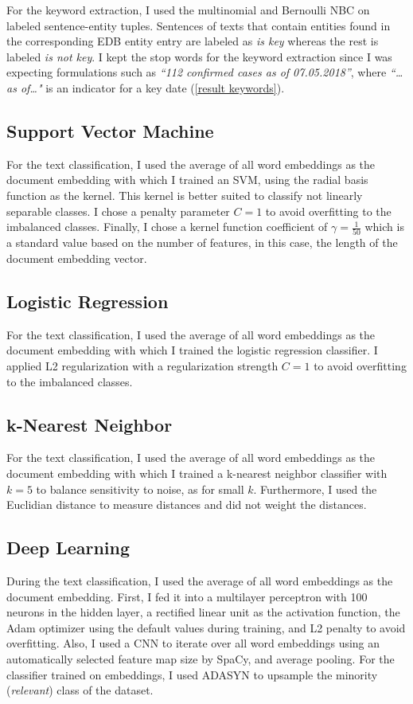   For the keyword extraction, I used the multinomial and Bernoulli NBC on labeled sentence-entity tuples.
  Sentences of texts that contain entities found in the corresponding EDB entity entry are labeled as \textsl{is key} whereas the rest is labeled \textsl{is not key}.
  I kept the stop words for the keyword extraction since I was expecting formulations such as \textit{``112 confirmed cases as of 07.05.2018''}, where \textit{``\dots as of\dots "} is an indicator for a key date (\ref{result keywords}).

\subsection{Support Vector Machine}
  For the text classification, I used the average of all word embeddings as the document embedding with which I trained an SVM, using the radial basis function as the kernel.
  This kernel is better suited to classify not linearly separable classes.
  I chose a penalty parameter $C=1$ to avoid overfitting to the imbalanced classes.
  Finally, I chose a kernel function coefficient of $\gamma = \frac{1}{50}$ which is a standard value based on the number of features, in this case, the length of the document embedding vector.

\subsection{Logistic Regression}
  For the text classification, I used the average of all word embeddings as the document embedding with which I trained the logistic regression classifier.
  I applied L2 regularization with a regularization strength $C=1$ to avoid overfitting to the imbalanced classes.

\subsection{k-Nearest Neighbor}
  For the text classification, I used the average of all word embeddings as the document embedding with which I trained a k-nearest neighbor classifier with $k=5$ to balance sensitivity to noise, as for small $k$. Furthermore, I used the Euclidian distance to measure distances and did not weight the distances.

\subsection{Deep Learning}
  During the text classification, I used the average of all word embeddings as the document embedding. First, I fed it into a multilayer perceptron with 100 neurons in the hidden layer, a rectified linear unit as the activation function, the Adam optimizer using the default values during training, and L2 penalty to avoid overfitting.
  Also, I used a CNN to iterate over all word embeddings using an automatically selected feature map size by SpaCy, and average pooling.
  For the classifier trained on embeddings, I used ADASYN to upsample the minority (\textsl{relevant}) class of the dataset.

